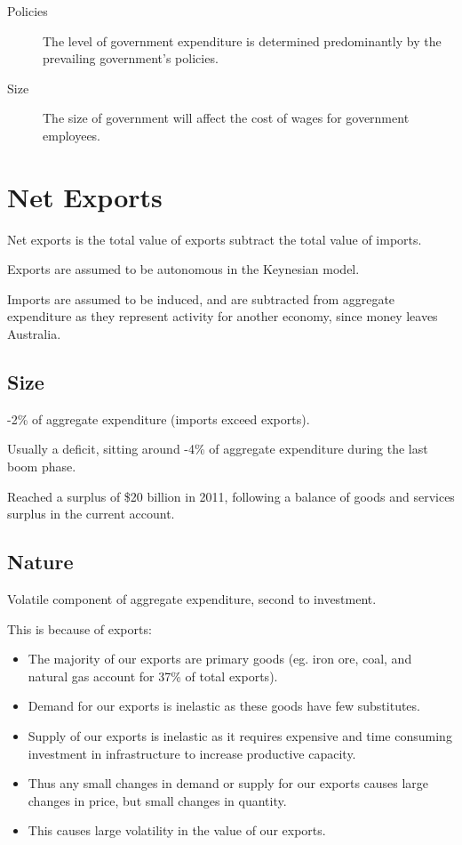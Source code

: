 \documentclass[a4paper,11pt]{report}
\begin{document}
\begin{description}
\item [Policies] The level of government expenditure is determined predominantly
	by the prevailing government's policies.
\item [Size] The size of government will affect the cost of wages for government
	employees.
\end{description}


\section{Net Exports}

Net exports is the total value of exports subtract the total value of imports.

Exports are assumed to be autonomous in the Keynesian model.

Imports are assumed to be induced, and are subtracted from aggregate expenditure
as they represent activity for another economy, since money leaves Australia.

\subsection{Size}

-2\% of aggregate expenditure (imports exceed exports).

Usually a deficit, sitting around -4\% of aggregate expenditure during the
last boom phase.

Reached a surplus of \$20 billion in 2011, following a balance of goods and
services surplus in the current account.

\subsection{Nature}

Volatile component of aggregate expenditure, second to investment.

This is because of exports:

\begin{itemize}
\item The majority of our exports are primary goods (eg.  iron ore, coal, and
	natural gas account for 37\% of total exports).
\item Demand for our exports is inelastic as these goods have few substitutes.
\item Supply of our exports is inelastic as it requires expensive and time
	consuming investment in infrastructure to increase productive capacity.
\item Thus any small changes in demand or supply for our exports causes large
	changes in price, but small changes in quantity.
\item This causes large volatility in the value of our exports.
\end{itemize}
\end{document}
